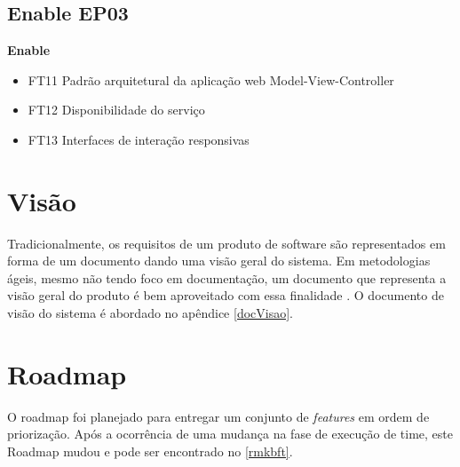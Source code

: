 \subsection{Enable EP03}
\textbf{Enable}
\begin{itemize}
    \item FT11 Padrão arquitetural da aplicação web Model-View-Controller
    \item FT12 Disponibilidade do serviço
    \item FT13 Interfaces de interação responsivas
\end{itemize}
\section{Visão}

Tradicionalmente, os requisitos de um produto de software são representados em forma de um documento dando uma visão geral do sistema. Em metodologias ágeis, mesmo não tendo foco em documentação, um documento que representa a visão geral do produto é bem aproveitado com essa finalidade \cite{leffingwell2011}. O documento de visão do sistema é abordado no apêndice \ref{docVisao}.

\section{Roadmap}

O roadmap foi planejado para entregar um conjunto de \textit{features} em ordem de priorização. Após a ocorrência de uma mudança na fase de execução de time, este Roadmap mudou e pode ser encontrado no \autoref{rmkbft}.


